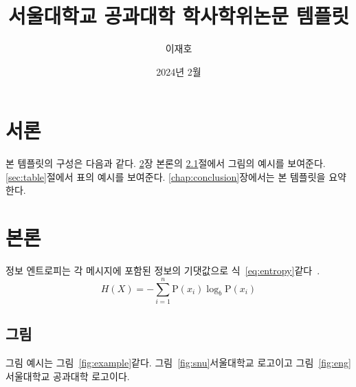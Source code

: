 \documentclass[ko]{snu-ece-bsc-thesis}
\title{서울대학교 공과대학 학사학위논문 템플릿}
\author{이재호}
\date{2024년 2월}
\begin{document}
\maketitle

\begin{abstract}
  \jiwon[1]
\end{abstract}

\tableofcontents
\listoftables
\listoffigures

\chapter{서론}\label{chap:introduction}
본 템플릿의 구성은 다음과 같다.
\ref{chap:body}장 본론의 \ref{sec:picture}절에서 그림의 예시를 보여준다.
\ref{sec:table}절에서 표의 예시를 보여준다.
\ref{chap:conclusion}장에서는 본 템플릿을 요약한다.

\jiwon[2-3]


\chapter{본론}\label{chap:body}
정보 엔트로피는 각 메시지에 포함된 정보의 기댓값으로 식~\eqref{eq:entropy}\와 같다~\cite{6773024}.
\begin{equation}\label{eq:entropy}
  H(X) = -\sum_{i=1}^n {\mathrm{P}(x_i) \log_b \mathrm{P}(x_i)}
\end{equation}

\jiwon[4-6]


\section{그림}\label{sec:picture}
그림 예시는 그림~\ref{fig:example}\와 같다. 그림~\ref{fig:snu}\은 서울대학교 로고이고 그림~\ref{fig:eng}\는 서울대학교 공과대학 로고이다.
\end{document}
